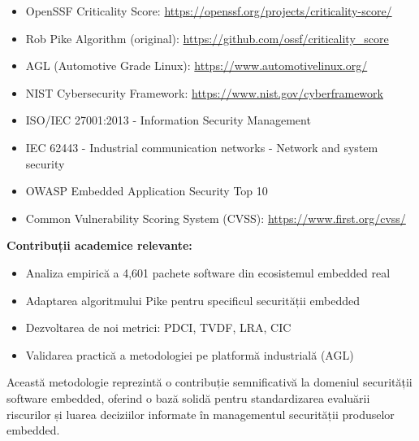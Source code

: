 \documentclass[12pt,a4paper]{article}
\begin{document}
\begin{itemize}
\item OpenSSF Criticality Score: \url{https://openssf.org/projects/criticality-score/}
\item Rob Pike Algorithm (original): \url{https://github.com/ossf/criticality_score}
\item AGL (Automotive Grade Linux): \url{https://www.automotivelinux.org/}
\item NIST Cybersecurity Framework: \url{https://www.nist.gov/cyberframework}
\item ISO/IEC 27001:2013 - Information Security Management
\item IEC 62443 - Industrial communication networks - Network and system security
\item OWASP Embedded Application Security Top 10
\item Common Vulnerability Scoring System (CVSS): \url{https://www.first.org/cvss/}
\end{itemize}

\textbf{Contribuții academice relevante:}
\begin{itemize}
\item Analiza empirică a 4,601 pachete software din ecosistemul embedded real
\item Adaptarea algoritmului Pike pentru specificul securității embedded
\item Dezvoltarea de noi metrici: PDCI, TVDF, LRA, CIC
\item Validarea practică a metodologiei pe platformă industrială (AGL)
\end{itemize}

Această metodologie reprezintă o contribuție semnificativă la domeniul securității software embedded, oferind o bază solidă pentru standardizarea evaluării riscurilor și luarea deciziilor informate în managementul securității produselor embedded.
\end{document}
